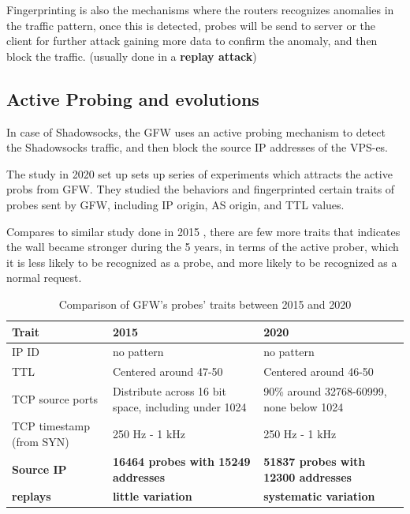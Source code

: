 \documentclass[nonacm,sigplan,screen]{acmart}
\begin{document}
Fingerprinting is also the mechanisms where the routers recognizes
anomalies in the traffic pattern, \cite{26_gfwSS2020} once this is
detected, probes will be send to server or the client for further attack
gaining more data to confirm the anomaly, and then block the traffic.
(usually done in a \textbf{replay attack})

\hypertarget{active-probing-and-evolutions}{%
\subsection{Active Probing and
evolutions}\label{active-probing-and-evolutions}}

In case of Shadowsocks, the GFW uses an active probing mechanism to
detect the Shadowsocks traffic, and then block the source IP addresses
of the VPS-es.

The study in 2020 set up sets up series of experiments which attracts
the active probs from GFW. They studied the behaviors and fingerprinted
certain traits of probes sent by GFW, including IP origin, AS origin,
and TTL values.

Compares to similar study done in 2015 \cite{46_gfw-discover}, there are
few more traits that indicates the wall became stronger during the 5
years, in terms of the active prober, which it is less likely to be
recognized as a probe, and more likely to be recognized as a normal
request.

\begin{table}[ht]
    \begin{tabular}{ | l | l | l | c | }
        \hline
        \textbf{Trait} & \textbf{2015} & \textbf{2020} \\ \hline
        IP ID & no pattern & no pattern \\\hline
        TTL & Centered around 47-50 & Centered around 46-50 \\\hline
        TCP source ports & Distribute across 16 bit space, including under 1024 & 90\% around 32768-60999, none below 1024 \\\hline
        TCP timestamp (from SYN) & 250 Hz - 1 kHz & 250 Hz - 1 kHz \\\hline
        \textbf{Source IP} & \textbf{16464 probes with 15249 addresses} & \textbf{51837 probes with 12300 addresses} \\\hline
        \textbf{replays} & \textbf{little variation} & \textbf{systematic variation} \\ \hline
    \end{tabular}
    \caption{Comparison of GFW's probes' traits between 2015 and 2020}
    \label{tab:my_label}
\end{table}
\end{document}
